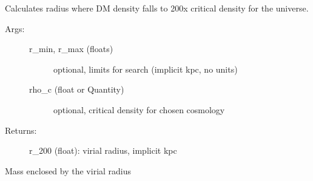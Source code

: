 \documentclass[letterpaper,10pt,english]{sphinxmanual}
\begin{document}
\begin{fulllineitems}
\begin{fulllineitems}
\begin{description}
\begin{description}
\end{description}

\end{description}

\end{fulllineitems}


\begin{fulllineitems}
\label{\detokenize{massprofile:galaxy.massprofile.MassProfile.virial_radius}}
Calculates radius where DM density falls to 200x critical density
for the universe.
\begin{description}
\item[{Args:}] \leavevmode\begin{description}
\item[{r\_min, r\_max (floats)}] \leavevmode
optional, limits for search (implicit kpc, no units)

\item[{rho\_c (float or Quantity)}] \leavevmode
optional, critical density for chosen cosmology

\end{description}

\item[{Returns:}] \leavevmode
r\_200 (float): virial radius, implicit kpc

\end{description}

\end{fulllineitems}


\begin{fulllineitems}
\label{\detokenize{massprofile:galaxy.massprofile.MassProfile.virial_mass}}
Mass enclosed by the virial radius

\end{fulllineitems}


\end{fulllineitems}

\label{\detokenize{timecourse:module-galaxy.timecourse}}
\end{document}

